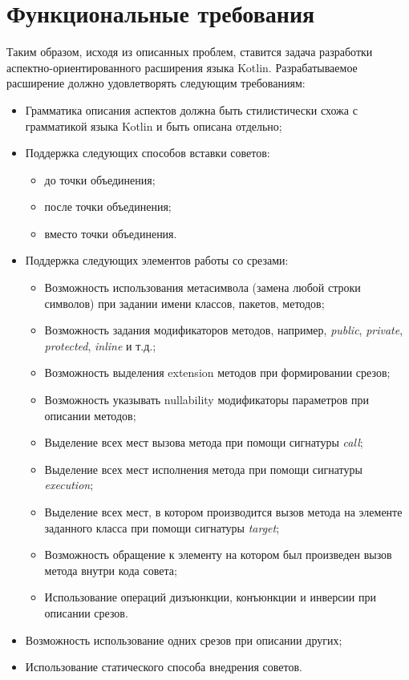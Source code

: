 \section{Функциональные требования}
Таким образом, исходя из описанных проблем, ставится задача разработки аспектно-ориентированного расширения языка Kotlin.
Разрабатываемое расширение должно удовлетворять следующим требованиям:
\begin{itemize}
    \item Грамматика описания аспектов должна быть стилистически схожа с грамматикой языка Kotlin и быть описана отдельно;
    \item Поддержка следующих способов вставки советов:
    \begin{itemize}
        \item до точки объединения;
        \item после точки объединения;
        \item вместо точки объединения.
    \end{itemize}
    \item Поддержка следующих элементов работы со срезами:
    \begin{itemize}
        \item Возможность использования метасимвола \quotes{*} (замена любой строки символов) при задании имени классов, пакетов, методов;
        \item Возможность задания модификаторов методов, например, \textit{public}, \textit{private}, \textit{protected}, \textit{inline} и т.д.;
        \item Возможность выделения extension методов при формировании срезов;
        \item Возможность указывать nullability модификаторы параметров при описании методов;
        \item Выделение всех мест вызова метода при помощи сигнатуры \textit{call};
        \item Выделение всех мест исполнения метода при помощи сигнатуры \textit{execution};
        \item Выделение всех мест, в котором производится вызов метода на элементе заданного класса при помощи сигнатуры \textit{target};
        \item Возможность обращение к элементу на котором был произведен вызов метода внутри кода совета;
        \item Использование операций дизъюнкции, конъюнкции и инверсии при описании срезов.
    \end{itemize}
    \item Возможность использование одних срезов при описании других;
    \item Использование статического способа внедрения советов.
\end{itemize}
